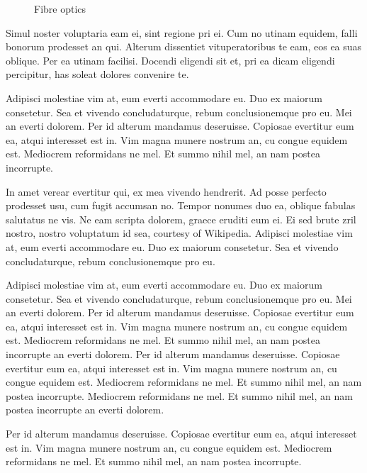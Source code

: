 \begin{figure}[htb]
\begin{center}
  \end{center}
  \caption{Fibre optics}
  \label{CHAPTER3_FIG01}
\end{figure}

Simul noster voluptaria eam ei, sint regione pri ei. Cum no utinam equidem, 
falli bonorum prodesset an qui. Alterum dissentiet vituperatoribus te eam, 
eos ea suas oblique. Per ea utinam facilisi. Docendi eligendi sit et, pri ea 
dicam eligendi percipitur, has soleat dolores convenire te.

Adipisci molestiae vim at, eum everti accommodare eu. Duo ex maiorum 
consetetur. Sea et vivendo concludaturque, rebum conclusionemque pro eu. Mei 
an everti dolorem. Per id alterum mandamus deseruisse. Copiosae evertitur eum 
ea, atqui interesset est in. Vim magna munere nostrum an, cu congue equidem 
est. Mediocrem reformidans ne mel. Et summo nihil mel, an nam postea 
incorrupte.

In amet verear evertitur qui, ex mea vivendo hendrerit. Ad posse perfecto 
prodesset usu, cum fugit accumsan no. Tempor nonumes duo ea, oblique fabulas 
salutatus ne vis. Ne eam scripta dolorem, graece eruditi eum ei. Ei sed brute 
zril nostro, nostro voluptatum id sea, courtesy of Wikipedia. \cite{Wikipedia}
Adipisci molestiae vim at, eum everti accommodare eu. Duo ex maiorum 
consetetur. Sea et vivendo concludaturque, rebum conclusionemque pro eu.

Adipisci molestiae vim at, eum everti accommodare eu. Duo ex maiorum 
consetetur. Sea et vivendo concludaturque, rebum conclusionemque pro eu. Mei 
an everti dolorem. Per id alterum mandamus deseruisse. Copiosae evertitur eum 
ea, atqui interesset est in. Vim magna munere nostrum an, cu congue equidem 
est. Mediocrem reformidans ne mel. Et summo nihil mel, an nam postea 
incorrupte an everti dolorem. Per id alterum mandamus deseruisse. Copiosae 
evertitur eum ea, atqui interesset est in. Vim magna munere nostrum an, cu 
congue equidem est. Mediocrem reformidans ne mel. Et summo nihil mel, an nam 
postea incorrupte. Mediocrem reformidans ne mel. Et summo nihil mel, an nam 
postea incorrupte an everti dolorem. 

Per id alterum mandamus deseruisse. Copiosae evertitur eum ea, atqui 
interesset est in. Vim magna munere nostrum an, cu congue equidem est. 
Mediocrem reformidans ne mel. Et summo nihil mel, an nam postea incorrupte.

